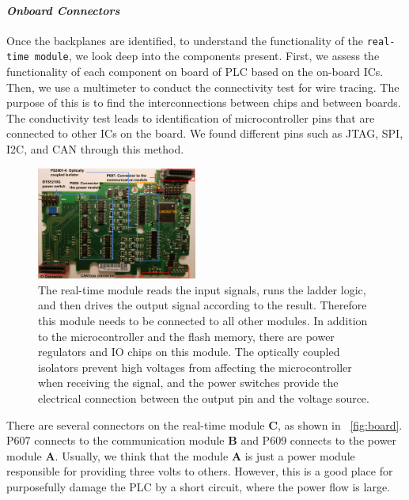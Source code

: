 \paragraph{\textbf{\textit{Onboard Connectors}}} Once the backplanes are identified, to understand the functionality of the \texttt{real-time module}, we look deep into the components present. First, we assess the functionality of each component on board of PLC based on the on-board ICs. Then, we use a multimeter to conduct the connectivity test for wire tracing. The purpose of this is to find the interconnections between chips and between boards. The conductivity test leads to identification of microcontroller pins that are connected to other ICs on the board. We found different pins such as JTAG, SPI, I2C, and CAN through this method. %

\begin{figure}[tp!]
	\includegraphics[width=0.47\textwidth]{figures/board3}
	\centering
	\caption{The real-time module reads the input signals, runs the ladder logic, and then drives the output signal according to the result. Therefore this module needs to be connected to all other modules. In addition to the microcontroller and the flash memory, there are power regulators and IO chips on this module. The optically coupled isolators prevent high voltages from affecting the microcontroller when receiving the signal, and the power switches provide the electrical connection between the output pin and the voltage source.}
	\label{fig:board}
\end{figure}

There are several connectors on the real-time module \textbf{C}, as shown in ~\autoref{fig:board}. P607 connects to the communication module \textbf{B} and P609 connects to the power module \textbf{A}. Usually, we think that the module \textbf{A} is just a power module responsible for providing three volts to others. However, this is a good place for purposefully damage the PLC by a short circuit, where the power flow is large.

